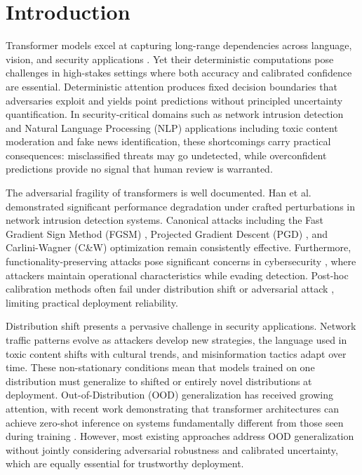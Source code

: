 \documentclass[12pt,a4paper]{article}
\theoremstyle{definition}
\begin{document}
\section{Introduction}

Transformer models excel at capturing long-range dependencies across language, vision, and security applications \citep{vaswani2017attention}. Yet their deterministic computations pose challenges in high-stakes settings where both accuracy and calibrated confidence are essential. Deterministic attention produces fixed decision boundaries that adversaries exploit and yields point predictions without principled uncertainty quantification. In security-critical domains such as network intrusion detection and Natural Language Processing (NLP) applications including toxic content moderation and fake news identification, these shortcomings carry practical consequences: misclassified threats may go undetected, while overconfident predictions provide no signal that human review is warranted.

The adversarial fragility of transformers is well documented. Han et al. \citep{han2021evaluating} demonstrated significant performance degradation under crafted perturbations in network intrusion detection systems. Canonical attacks including the Fast Gradient Sign Method (FGSM) \citep{goodfellow2014explaining}, Projected Gradient Descent (PGD) \citep{madry2018towards}, and Carlini-Wagner (C\&W) optimization \citep{carlini2017towards} remain consistently effective. Furthermore, functionality-preserving attacks pose significant concerns in cybersecurity \citep{mccarthy2022functionality}, where attackers maintain operational characteristics while evading detection. Post-hoc calibration methods often fail under distribution shift or adversarial attack \citep{guo2017calibration,desai2020calibration}, limiting practical deployment reliability.

Distribution shift presents a pervasive challenge in security applications. Network traffic patterns evolve as attackers develop new strategies, the language used in toxic content shifts with cultural trends, and misinformation tactics adapt over time. These non-stationary conditions mean that models trained on one distribution must generalize to shifted or entirely novel distributions at deployment. Out-of-Distribution (OOD) generalization has received growing attention, with recent work demonstrating that transformer architectures can achieve zero-shot inference on systems fundamentally different from those seen during training \citep{zhai2025bridging}. However, most existing approaches address OOD generalization without jointly considering adversarial robustness and calibrated uncertainty, which are equally essential for trustworthy deployment.
\end{document}
